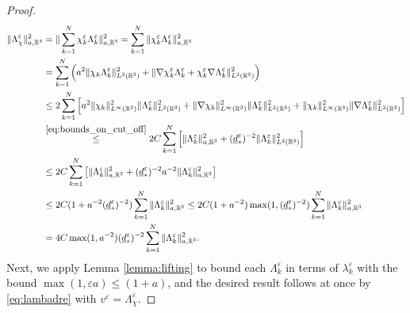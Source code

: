 \documentclass[]{article}
\numberwithin{equation}{section}
\numberwithin{theorem}{section}
\numberwithin{lemma}{section}
\numberwithin{corollary}{section}
\numberwithin{proposition}{section}
\numberwithin{definition}{section}
\newcommand{\re}{\varepsilon}
\begin{document}
\begin{appendices}
\begin{proof}
			\begin{align*}%
				\| \Lambda^{\re}_{\chi} \|^2_{a, \mathbb{R}^3} &=  \|  \sum_{k=1}^N \chi_k^{\re} \Lambda^{\re}_k \|^2_{a,\mathbb{R}^3} = \sum_{k=1}^N \|  \chi_k^{\re} \Lambda^{\re}_k \|^2_{a,\mathbb{R}^3}\\ 
				&=\sum_{k=1}^N \left( a^2 \|  \chi_k \Lambda^{\re}_k \|^2_{L^2(\mathbb{R}^3)}+\|  \nabla\chi_k^{\re} \Lambda^{\re}_k+\chi_k^{\re}\nabla \Lambda^{\re}_k \|^2_{L^2(\mathbb{R}^3)}\right)\\
				&\leq 2\sum_{k=1}^{N}  \left[a^2 \| \chi_k \|^2_{L^{\infty}(\mathbb{R}^3)} \| \Lambda^{\re}_k \|^2_{L^2(\mathbb{R}^3)}  + \| \nabla \chi_k \|^2_{L^{\infty}(\mathbb{R}^3)} \| \Lambda^{\re}_k \|^2_{L^2(\mathbb{R}^3)} + \| \chi_k \|^2_{L^{\infty}(\mathbb{R}^3)} \|\nabla \Lambda^{\re}_k \|^2_{L^2(\mathbb{R}^3)} \right]\\
				&\overset{	\eqref{eq:bounds_on_cut_off}}{\leq }2C\sum_{k=1}^{N} \left[\| \Lambda^{\re}_k \|^2_{a, \mathbb{R}^3} + (\underline{d}^{\re}_*)^{-2} \| \Lambda^{\re}_k \|^2_{L^2(\mathbb{R}^3)}\right] \\
				&\leq 2C \sum_{k=1}^{N} \left[\| \Lambda^{\re}_k \|^2_{a, \mathbb{R}^3} + ( \underline{d}^{\re}_*)^{-2} a^{-2} \| \Lambda^{\re}_k \|^2_{a, \mathbb{R}^3}\right] \\
				&\leq 2C(1+ a^{-2}(\underline{d}^{\re}_*)^{-2}) \sum_{k=1}^{N} \| \Lambda^{\re}_k \|^2_{a, \mathbb{R}^3}\leq 2C(1+ a^{-2})\max(1, (\underline{d}^{\re}_*)^{-2})\sum_{k=1}^{N} \| \Lambda^{\re}_k \|^2_{a, \mathbb{R}^3}\\
				&= 4C\max(1,a^{-2}) (\underline{d}^{\re}_*)^{-2}\sum_{k=1}^{N} \| \Lambda^{\re}_k \|^2_{a, \mathbb{R}^3}.
			\end{align*}
			Next, we apply Lemma \ref{lemma:lifting} to bound each $\Lambda_k^{\re}$ in terms of $\lambda^{\re}_k$ with the bound $\max(1, \re a) \leq (1+a)$, and the desired result follows at once by \eqref{eq:lambadre} with $v^{\re}=\Lambda^{\re}_{\chi}$.
		\end{proof}
		
		

\end{appendices}
\end{document}
